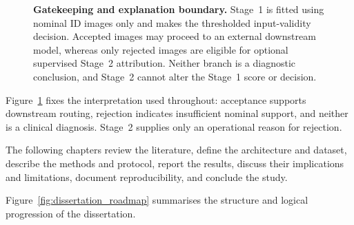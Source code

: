 \documentclass[fleqn,12pt]{olplainarticle}
\begin{document}
\begin{figure}[H]
    \caption[Stage 1 gatekeeping and post-rejection explanation.]{
    \textbf{Gatekeeping and explanation boundary.} Stage~1 is fitted using
    nominal ID images only and makes the thresholded input-validity decision.
    Accepted images may proceed to an external downstream model, whereas only
    rejected images are eligible for optional supervised Stage~2 attribution.
    Neither branch is a diagnostic conclusion, and Stage~2 cannot alter the
    Stage~1 score or decision.}
    \label{fig:ood_pipeline}
\end{figure}


Figure~\ref{fig:ood_pipeline} fixes the interpretation used throughout: acceptance supports downstream routing, rejection indicates insufficient nominal support, and neither is a clinical diagnosis. Stage~2 supplies only an operational reason for rejection.

The following chapters review the literature, define the architecture and dataset, describe the methods and protocol, report the results, discuss their implications and limitations, document reproducibility, and conclude the study.

Figure~\ref{fig:dissertation_roadmap} summarises the structure and logical progression of the dissertation.
\end{document}
